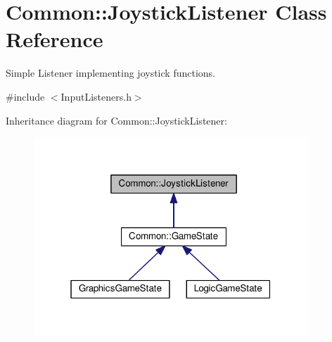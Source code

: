 \hypertarget{class_common_1_1_joystick_listener}{}\section{Common\+:\+:Joystick\+Listener Class Reference}
\label{class_common_1_1_joystick_listener}


Simple Listener implementing joystick functions.  




{\ttfamily \#include $<$Input\+Listeners.\+h$>$}



Inheritance diagram for Common\+:\+:Joystick\+Listener\+:\nopagebreak
\begin{figure}[H]
\begin{center}
\leavevmode
\includegraphics[width=292pt]{class_common_1_1_joystick_listener__inherit__graph}
\end{center}
\end{figure}
